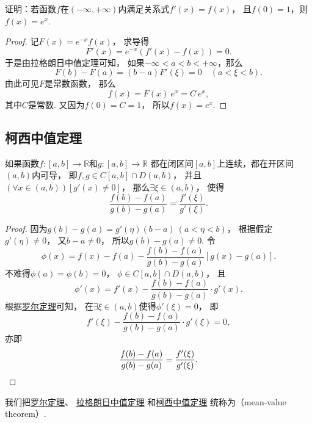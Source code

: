 \begin{example}
证明：若函数\(f\)在\((-\infty,+\infty)\)内满足关系式\(f'(x) = f(x)\)，
且\(f(0) = 1\)，则\(f(x) = e^x\).
\begin{proof}
记\(F(x) = e^{-x} f(x)\)，
求导得\[
	F'(x) = e^{-x} (f'(x) - f(x))
	= 0.
\]
于是由拉格朗日中值定理可知，
如果\(-\infty<a<b<+\infty\)，那么\[
	F(b) - F(a)
	= (b-a) F'(\xi)
	= 0
	\quad(a<\xi<b).
\]
由此可见\(F\)是常数函数，
那么\[
	f(x) = F(x)~e^x = C~e^x,
\]
其中\(C\)是常数.
又因为\(f(0) = C = 1\)，
所以\(f(x) = e^x\).
\end{proof}
\end{example}

\subsection{柯西中值定理}
\begin{theorem}[柯西中值定理]\label{theorem:微分中值定理.柯西中值定理}
如果函数\(f\colon[a,b]\to\mathbb{R}\)和\(g\colon[a,b]\to\mathbb{R}\)
都在闭区间\([a,b]\)上连续，都在开区间\((a,b)\)内可导，
即\(f,g \in C[a,b] \cap D(a,b)\)，
并且\((\forall x\in(a,b))[g'(x) \neq 0]\)，
那么\(\exists\xi\in(a,b)\)，
使得\begin{equation}
	\frac{f(b)-f(a)}{g(b)-g(a)}=\frac{f'(\xi)}{g'(\xi)}.
\end{equation}
\begin{proof}
因为\(g(b)-g(a)=g'(\eta)(b-a)\ (a<\eta<b)\)，
根据假定\(g'(\eta)\neq0\)，
又\(b-a\neq0\)，
所以\(g(b)-g(a)\neq0\).
令\[
	\phi(x)=f(x)-f(a)-\frac{f(b)-f(a)}{g(b)-g(a)}[g(x)-g(a)].
\]
不难得\(\phi(a)=\phi(b)=0\)，
\(\phi\in C[a,b]\cap D(a,b)\)，
且\[
	\phi'(x)=f'(x)-\frac{f(b)-f(a)}{g(b)-g(a)}\cdot g'(x).
\]
根据\hyperref[theorem:微分中值定理.罗尔定理]{罗尔定理}可知，
在\(\exists\xi\in(a,b)\)使得\(\phi'(\xi)=0\)，
即\[
	f'(\xi)-\frac{f(b)-f(a)}{g(b)-g(a)}\cdot g'(\xi)=0,
\]
亦即\[
	\frac{f(b)-f(a)}{g(b)-g(a)}=\frac{f'(\xi)}{g'(\xi)}.
	\qedhere
\]
\end{proof}
\end{theorem}

我们把\hyperref[theorem:微分中值定理.罗尔定理]{罗尔定理}、
\hyperref[theorem:微分中值定理.拉格朗日中值定理]{拉格朗日中值定理}%
和\hyperref[theorem:微分中值定理.柯西中值定理]{柯西中值定理}%
统称为（mean-value theorem）.

